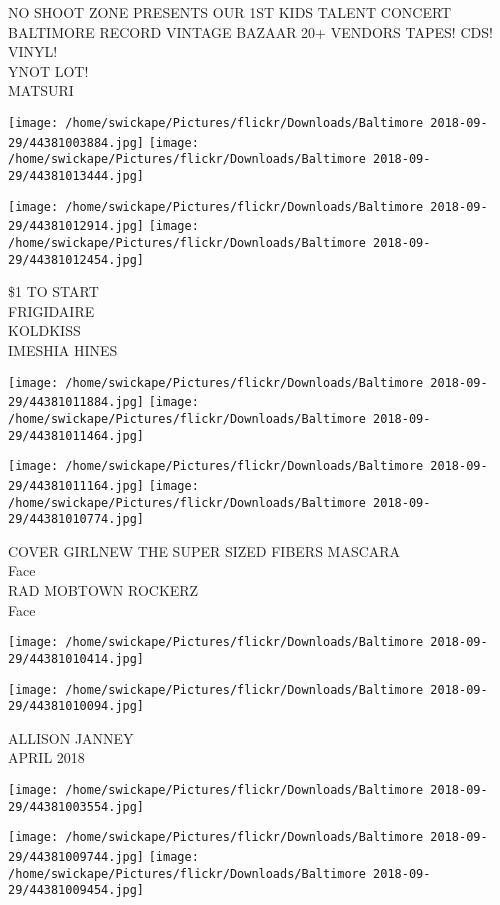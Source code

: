 \documentclass[10pt,letterpaper]{article}
\begin{document}
NO SHOOT ZONE PRESENTS OUR 1ST KIDS TALENT CONCERT\\
BALTIMORE RECORD VINTAGE BAZAAR 20+ VENDORS TAPES!  CDS!  VINYL!\\
YNOT LOT!\\
MATSURI
\pagebreak

\texttt{[image: /home/swickape/Pictures/flickr/Downloads/Baltimore 2018-09-29/44381003884.jpg]}
\texttt{[image: /home/swickape/Pictures/flickr/Downloads/Baltimore 2018-09-29/44381013444.jpg]}

\texttt{[image: /home/swickape/Pictures/flickr/Downloads/Baltimore 2018-09-29/44381012914.jpg]}
\texttt{[image: /home/swickape/Pictures/flickr/Downloads/Baltimore 2018-09-29/44381012454.jpg]}

\$1 TO START\\
FRIGIDAIRE\\
KOLDKISS\\
IMESHIA HINES
\pagebreak

\texttt{[image: /home/swickape/Pictures/flickr/Downloads/Baltimore 2018-09-29/44381011884.jpg]}
\texttt{[image: /home/swickape/Pictures/flickr/Downloads/Baltimore 2018-09-29/44381011464.jpg]}

\texttt{[image: /home/swickape/Pictures/flickr/Downloads/Baltimore 2018-09-29/44381011164.jpg]}
\texttt{[image: /home/swickape/Pictures/flickr/Downloads/Baltimore 2018-09-29/44381010774.jpg]}

COVER GIRLNEW THE SUPER SIZED FIBERS MASCARA\\
Face\\
RAD MOBTOWN ROCKERZ\\
Face
\pagebreak

\texttt{[image: /home/swickape/Pictures/flickr/Downloads/Baltimore 2018-09-29/44381010414.jpg]}

\vspace{0.25in}
\texttt{[image: /home/swickape/Pictures/flickr/Downloads/Baltimore 2018-09-29/44381010094.jpg]}

ALLISON JANNEY\\
APRIL 2018
\pagebreak

\texttt{[image: /home/swickape/Pictures/flickr/Downloads/Baltimore 2018-09-29/44381003554.jpg]}

\vspace{0.25in}
\texttt{[image: /home/swickape/Pictures/flickr/Downloads/Baltimore 2018-09-29/44381009744.jpg]}
\texttt{[image: /home/swickape/Pictures/flickr/Downloads/Baltimore 2018-09-29/44381009454.jpg]}
\end{document}
